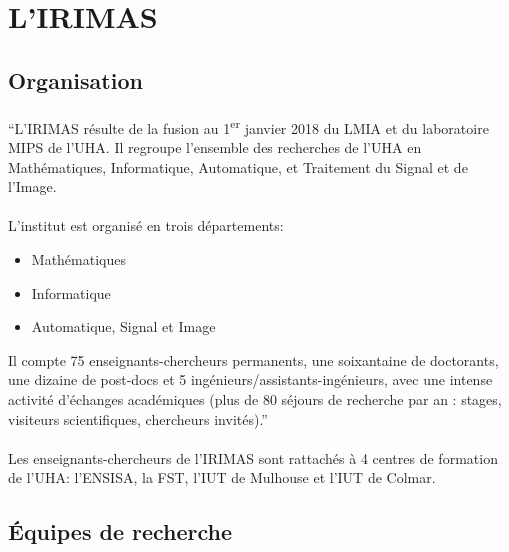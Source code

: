 \documentclass[a4paper,11pt,twoside,french,report]{../common/simplem}
\begin{document}
		\section{L'\acrshort{IRIMAS}}
			\subsection{Organisation}
				\paragraph*{}
					``L'\gls{IRIMAS} résulte de la fusion au 1\textsuperscript{er} janvier 2018 du \gls{LMIA} et du laboratoire \gls{MIPS} de l'\gls{UHA}. Il regroupe l'ensemble des recherches de l'\gls{UHA} en Mathématiques, Informatique, Automatique, et Traitement du Signal et de l'Image.
				\paragraph*{}
					L’institut est organisé en trois départements:
					\begin{itemize}
						\item Mathématiques
						\item Informatique
						\item Automatique, Signal et Image
					\end{itemize}
					Il compte 75 enseignants-chercheurs permanents, une soixantaine de doctorants, une dizaine de post-docs et 5 ingénieurs/assistants-ingénieurs, avec une intense activité d’échanges académiques (plus de 80 séjours de recherche par an : stages, visiteurs scientifiques, chercheurs invités).''~\cite{UHA_IRIMAS}
				\paragraph*{}
					Les enseignants-chercheurs de l'\gls{IRIMAS} sont rattachés à 4 centres de formation de l'\gls{UHA}: l'\gls{ENSISA}, la \gls{FST}, l'\gls{IUT} de Mulhouse et l'\gls{IUT} de Colmar.
			\subsection{Équipes de recherche}
\end{document}
